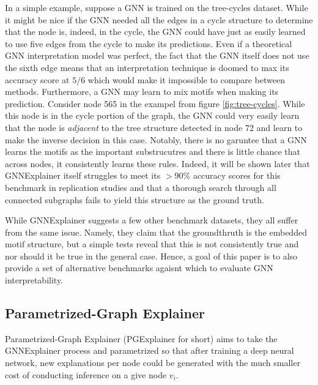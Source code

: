In a simple example, suppose a GNN is trained on the tree-cycles dataset. While it might be nice if the GNN needed all the edges in a cycle structure to determine that the node is, indeed, in the cycle, the GNN could have just as easily learned to use five edges from the cycle to make its predictions. Even if a theoretical GNN interpretation model was perfect, the fact that the GNN itself does not use the sixth edge means that an interpretation technique is doomed to max its accuracy score at $5/6$ which would make it impossible to compare between methods. Furthermore, a GNN may learn to mix motifs when making its prediction. Consider node 565 in the exampel from figure \ref{fig:tree-cycles}. While this node is in the cycle portion of the graph, the GNN could very easily learn that the node is \textit{adjacent} to the tree structure detected in node 72 and learn to make the inverse decision in this case. Notably, there is no garuntee that a GNN learns the motifs as the important substrucutres and there is little chance that across nodes, it consistently learns these rules. Indeed, it will be shown later that GNNExplainer itself struggles to meet its $>90\%$ accuracy scores for this benchmark in replication studies \cite{yuan_explainability_2021} \cite{lin_generative_2021} and that a thorough search through all connected subgraphs fails to yield this structure as the ground truth. 

While GNNExplainer suggests a few other benchmark datasets, they all suffer from the same issue. Namely, they claim that the groundthruth is the embedded motif structure, but a simple tests reveal that this is not consistently true and nor should it be true in the general case. Hence, a goal of this paper is to also provide a set of alternative benchmarks agaisnt which to evaluate GNN interpretability.

\subsection{Parametrized-Graph Explainer}
Parametrized-Graph Explainer (PGExplainer for short) aims to take the GNNExplainer process and parametrized so that after training a deep neural network, new explanations per node could be generated with the much smaller cost of conducting inference on a give node $v_i$.

